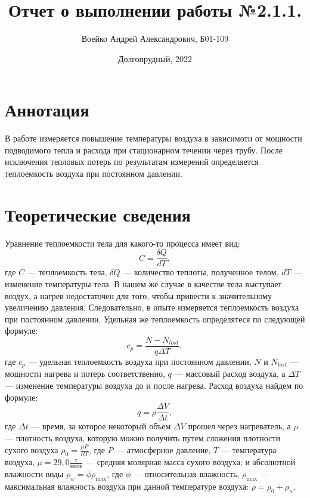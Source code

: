 \documentclass[a4paper,11pt]{article}
\title{Отчет о выполнении работы №2.1.1.}
\author{Воейко Андрей Александрович, Б01-109}
\date{Долгопрудный, 2022}
\begin{document}
\maketitle
\newpage
\section{Аннотация}
\newline
В работе измеряется повышение температуры воздуха в зависимоти от мощности подводимого тепла и расхода при стационарном течении через трубу. После исключения тепловых потерь по результатам измерений определяется теплоемкость воздуха при постоянном давлении.
\section{Теоретические сведения}
Уравнение теплоемкости тела для какого-то процесса имеет вид:
\begin{equation}    \label{eq1}
C = \frac{\delta Q}{dT},
\end{equation}
где $C$ — теплоемкость тела, $\delta Q$ — количество теплоты, полученное телом, $dT$ — изменение температуры тела.
В нашем же случае в качестве тела выступает воздух, а нагрев недостаточен для того, чтобы привести к значительному увеличению давления. Следовательно, в опыте измеряется теплоемкость воздуха при постоянном давлении.
\newline
Удельная же теплоемкость определятеся по следующей формуле:
\begin{equation}    \label{eq2}
c_{p} = \frac{N - N_{lost}}{q \Delta T},
\end{equation}
где $c_{p}$ — удельная теплоемкость воздуха при постоянном давлении, $N$ и $N_{lost}$ — мощности нагрева и потерь соответственно, $q$ — массовый расход воздуха, а $\Delta T$ — изменение температуры воздуха до и после нагрева.
\newline
Расход воздуха найдем по формуле:
\begin{equation}    \label{eq3}
q = \rho \frac{\Delta V}{\Delta t},
\end{equation}
где $\Delta t$ — время, за которое некоторый объем $\Delta V$ прошел через нагреватель, а $\rho$ — плотность воздуха, которую можно получить путем сложения плотности сухого воздуха $\rho _{0} = \frac{\mu P}{RT}$, где $P$ — атмосферное давление, $T$ — температура воздуха, $\mu = 29,0 \frac{г}{моль}$ — средняя молярная масса сухого воздуха; и абсолютной влажности воды $\rho _{w} = \phi \rho _{\max}$, где $\phi$ — относительная влажность, $\rho _{\max}$ — максимальная влажность воздуха при данной температуре воздуха: $\rho = \rho _{0} + \rho _{w}$.
\end{document}
